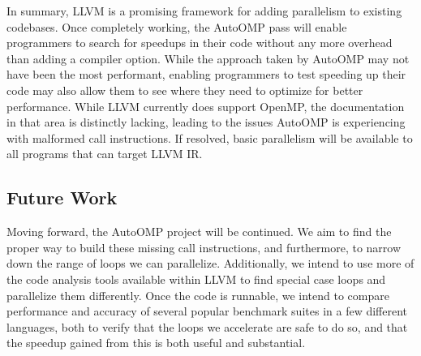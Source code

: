\documentclass[conference]{IEEEtran}
\begin{document}
In summary, LLVM is a promising framework for adding parallelism to existing codebases. 
Once completely working, the AutoOMP pass will enable programmers to search for speedups
in their code without any more overhead than adding a compiler option. While the approach
taken by AutoOMP may not have been the most performant, enabling programmers to test speeding
up their code may also allow them to see where they need to optimize for better performance.
While LLVM currently does support OpenMP, the documentation in that area is distinctly lacking,
leading to the issues AutoOMP is experiencing with malformed call instructions. If resolved,
basic parallelism will be available to all programs that can target LLVM IR. 


\subsection{Future Work}


Moving forward, the AutoOMP project will be continued. We aim to find the proper way to build these
missing call instructions, and furthermore, to narrow down the range of loops we can parallelize.
Additionally, we intend to use more of the code analysis tools available within LLVM to find
special case loops and parallelize them differently. 
Once the code is runnable, we intend to compare performance and accuracy of several popular benchmark suites
in a few different languages, both to verify that the loops we accelerate are safe to do so, and that
the speedup gained from this is both useful and substantial.
%
%
\end{document}
